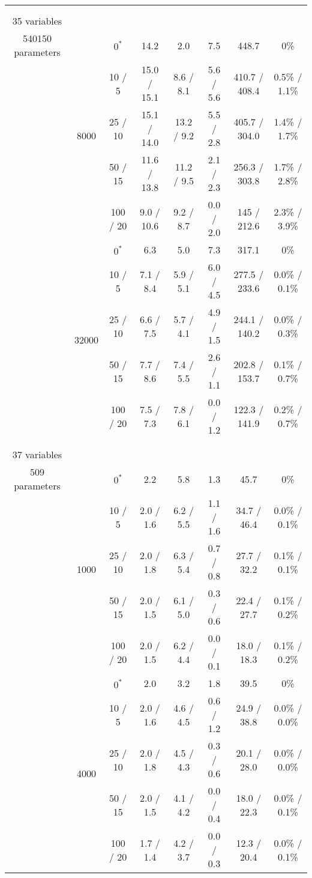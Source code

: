 \documentclass[twoside,11pt]{article}
\begin{document}
\begin{table}[H]
\begin{tabular}{ c | c | c || c | c | c | c | c  }
\hhline{=|=|=||=|=|=|=|=}
\multirow{10}{*}{\thead{\textbf{mildew} \\ \\ 35 variables \\ 540150 parameters}} & \multirow{5}{*}{8000} 
& $0^*$ & 14.2 & 2.0 & 7.5 & 448.7 & 0\% \\
& & 10 / 5 & 15.0 / 15.1 & 8.6 / 8.1 & 5.6 / 5.6 & 410.7 / 408.4 & 0.5\% / 1.1\% \\
& & 25 / 10 & 15.1 / 14.0 & 13.2 / 9.2 & 5.5 / 2.8 & 405.7 / 304.0 & 1.4\% / 1.7\% \\
& & 50 / 15 & 11.6 / 13.8 & 11.2 / 9.5 & 2.1 / 2.3 & 256.3 / 303.8 & 1.7\% / 2.8\% \\
& & 100 / 20 & 9.0 / 10.6 & 9.2 / 8.7 & 0.0 / 2.0 & 145 / 212.6 & 2.3\% / 3.9\% \\

\hhline{~|-|-||-|-|-|-|-} 
& \multirow{5}{*}{32000}
& $0^*$ & 6.3 & 5.0 & 7.3 & 317.1 & 0\% \\
& & 10 / 5 & 7.1 / 8.4 & 5.9 / 5.1 & 6.0 / 4.5 & 277.5 / 233.6 & 0.0\% / 0.1\% \\
& & 25 / 10 & 6.6 / 7.5 & 5.7 / 4.1 & 4.9 / 1.5 & 244.1 / 140.2 & 0.0\% / 0.3\% \\
& & 50 / 15 & 7.7 / 8.6 & 7.4 / 5.5 & 2.6 / 1.1 & 202.8 / 153.7 & 0.1\% / 0.7\% \\
& & 100 / 20 & 7.5 / 7.3 & 7.8 / 6.1 & 0.0 / 1.2 & 122.3 / 141.9 & 0.2\% / 0.7\% \\

\hhline{=|=|=||=|=|=|=|=}
\multirow{10}{*}{\thead{\textbf{alarm} \\ \\ 37 variables \\ 509 parameters}} & \multirow{5}{*}{1000} 
& $0^*$ & 2.2 & 5.8 & 1.3 & 45.7 & 0\% \\
& & 10 / 5 & 2.0 / 1.6 & 6.2 / 5.5 & 1.1 / 1.6 & 34.7 / 46.4 & 0.0\% / 0.1\% \\
& & 25 / 10 & 2.0 / 1.8 & 6.3 / 5.4 & 0.7 / 0.8 & 27.7 / 32.2 & 0.1\% / 0.1\% \\
& & 50 / 15 & 2.0 / 1.5 & 6.1 / 5.0 & 0.3 / 0.6 & 22.4 / 27.7 & 0.1\% / 0.2\% \\
& & 100 / 20 & 2.0 / 1.5 & 6.2 / 4.4 & 0.0 / 0.1 & 18.0 / 18.3 & 0.1\% / 0.2\% \\

\hhline{~|-|-||-|-|-|-|-} 
& \multirow{5}{*}{4000}
& $0^*$ & 2.0 & 3.2 & 1.8 & 39.5 & 0\% \\
& & 10 / 5 & 2.0 / 1.6 & 4.6 / 4.5 & 0.6 / 1.2 & 24.9 / 38.8 & 0.0\% / 0.0\% \\
& & 25 / 10 & 2.0 / 1.8 & 4.5 / 4.3 & 0.3 / 0.6 & 20.1 / 28.0 & 0.0\% / 0.0\% \\
& & 50 / 15 & 2.0 / 1.5 & 4.1 / 4.2 & 0.0 / 0.4 & 18.0 / 22.3 & 0.0\% / 0.1\% \\
& & 100 / 20 & 1.7 / 1.4 & 4.2 / 3.7 & 0.0 / 0.3 & 12.3 / 20.4 & 0.0\% / 0.1\% \\



\end{tabular}
\end{table}
\end{document}
